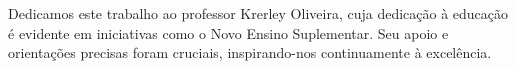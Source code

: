 \vspace*{\fill}

\hspace{8cm}
\begin{minipage}{0.45\textwidth}
    \raggedright
    Dedicamos este trabalho ao professor Krerley Oliveira, cuja dedicação à educação é evidente em iniciativas como o Novo Ensino Suplementar. Seu apoio e orientações precisas foram cruciais, inspirando-nos continuamente à excelência.
\end{minipage}
